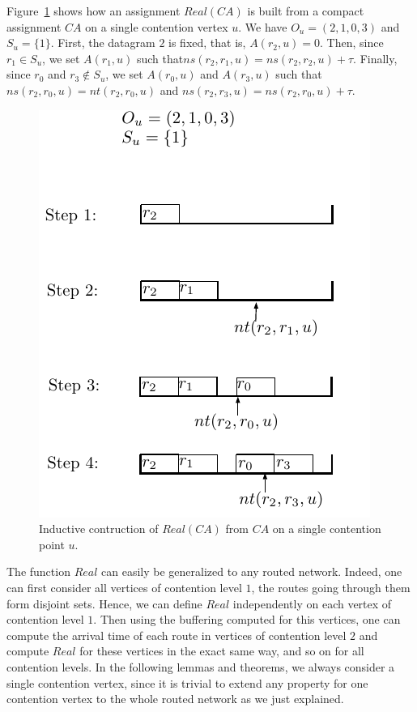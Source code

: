 \documentclass[english]{article}
\begin{document}
Figure~\ref{fig:compacttoassignment} shows how an assignment $Real(CA)$ is built from a compact assignment $CA$ on a single contention vertex $u$. We have $O_u = (2,1,0,3)$ and $S_u = \{1\}$. First, the datagram $2$ is fixed, that is, $A(r_2,u)=0$. Then, since $r_1 \in S_u$, we set $A(r_1,u)$ such that$ ns(r_2,r_1,u) = ns(r_2,r_2,u) + \tau$. 
Finally, since $r_0$ and $r_3 \notin S_u$, we set $A(r_0,u)$ and $A(r_3,u)$ such that $ns(r_2,r_0,u) = nt(r_2,r_0,u)$ and  $ns(r_2,r_3,u) = ns(r_2,r_0,u) + \tau$.
\begin{figure}[!h]
	\centering
	\includegraphics[scale=1]{compacttoassignment}
\caption{Inductive contruction of $Real(CA)$ from $CA$ on a single contention point $u$. }
\label{fig:compacttoassignment}
\end{figure}

The function $Real$ can easily be generalized to any routed network. Indeed, one can first consider all vertices of contention level $1$, the routes going through them form disjoint sets. Hence, we can define $Real$ independently on each vertex of contention level $1$. 
Then using the buffering computed for this vertices, one can compute the arrival time of each route in vertices of contention level $2$ and compute $Real$ for these vertices in the exact same way, and so on for all contention levels. In the following lemmas and theorems, we always consider a single contention vertex, since it is trivial to extend any property for one contention vertex to the whole routed network as we just explained. 
\end{document}
